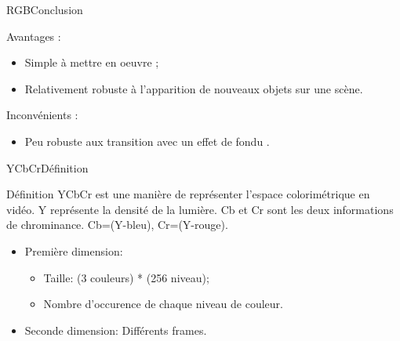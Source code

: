\begin{frame}{RGB}{Conclusion}

\begin{block}{Avantages :}

\begin{itemize}
    \item Simple à mettre en oeuvre ;
    \item Relativement robuste à l'apparition de nouveaux objets sur une scène.
\end{itemize}

\end{block}

\begin{block}{Inconvénients :}

\begin{itemize}
    \item Peu robuste aux transition avec un effet de fondu .
\end{itemize}

\end{block}

\end{frame}

\begin{frame}{YCbCr}{Définition}
\begin{block}{Définition}
YCbCr est une manière de représenter l'espace colorimétrique en vidéo. Y représente la densité de la lumière. Cb et Cr sont les deux informations de chrominance. Cb=(Y-bleu), Cr=(Y-rouge).

\begin{itemize}
	\item Première dimension: 
		\begin{itemize}
			\item Taille: (3 couleurs) * (256 niveau);
			\item Nombre d'occurence de chaque niveau de couleur.
		\end{itemize}
	\item Seconde dimension: Différents frames.
\end{itemize}

\end{block}

\end{frame}

